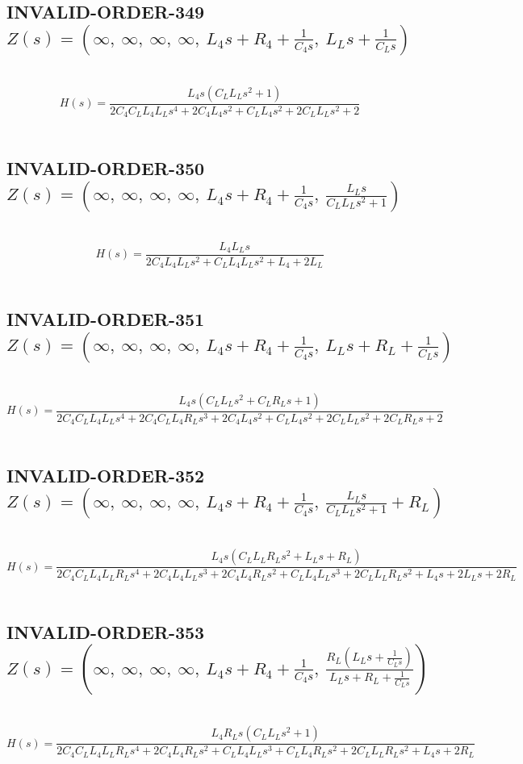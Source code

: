 \documentclass{article}
\begin{document}
\subsection{INVALID-ORDER-349 $Z(s) = \left( \infty, \  \infty, \  \infty, \  \infty, \  L_{4} s + R_{4} + \frac{1}{C_{4} s}, \  L_{L} s + \frac{1}{C_{L} s}\right)$ } \ 
\textbf{\[H(s) = \frac{L_{4} s \left(C_{L} L_{L} s^{2} + 1\right)}{2 C_{4} C_{L} L_{4} L_{L} s^{4} + 2 C_{4} L_{4} s^{2} + C_{L} L_{4} s^{2} + 2 C_{L} L_{L} s^{2} + 2}\] } \ 
\subsection{INVALID-ORDER-350 $Z(s) = \left( \infty, \  \infty, \  \infty, \  \infty, \  L_{4} s + R_{4} + \frac{1}{C_{4} s}, \  \frac{L_{L} s}{C_{L} L_{L} s^{2} + 1}\right)$ } \ 
\textbf{\[H(s) = \frac{L_{4} L_{L} s}{2 C_{4} L_{4} L_{L} s^{2} + C_{L} L_{4} L_{L} s^{2} + L_{4} + 2 L_{L}}\] } \ 
\subsection{INVALID-ORDER-351 $Z(s) = \left( \infty, \  \infty, \  \infty, \  \infty, \  L_{4} s + R_{4} + \frac{1}{C_{4} s}, \  L_{L} s + R_{L} + \frac{1}{C_{L} s}\right)$ } \ 
\textbf{\[H(s) = \frac{L_{4} s \left(C_{L} L_{L} s^{2} + C_{L} R_{L} s + 1\right)}{2 C_{4} C_{L} L_{4} L_{L} s^{4} + 2 C_{4} C_{L} L_{4} R_{L} s^{3} + 2 C_{4} L_{4} s^{2} + C_{L} L_{4} s^{2} + 2 C_{L} L_{L} s^{2} + 2 C_{L} R_{L} s + 2}\] } \ 
\subsection{INVALID-ORDER-352 $Z(s) = \left( \infty, \  \infty, \  \infty, \  \infty, \  L_{4} s + R_{4} + \frac{1}{C_{4} s}, \  \frac{L_{L} s}{C_{L} L_{L} s^{2} + 1} + R_{L}\right)$ } \ 
\textbf{\[H(s) = \frac{L_{4} s \left(C_{L} L_{L} R_{L} s^{2} + L_{L} s + R_{L}\right)}{2 C_{4} C_{L} L_{4} L_{L} R_{L} s^{4} + 2 C_{4} L_{4} L_{L} s^{3} + 2 C_{4} L_{4} R_{L} s^{2} + C_{L} L_{4} L_{L} s^{3} + 2 C_{L} L_{L} R_{L} s^{2} + L_{4} s + 2 L_{L} s + 2 R_{L}}\] } \ 
\subsection{INVALID-ORDER-353 $Z(s) = \left( \infty, \  \infty, \  \infty, \  \infty, \  L_{4} s + R_{4} + \frac{1}{C_{4} s}, \  \frac{R_{L} \left(L_{L} s + \frac{1}{C_{L} s}\right)}{L_{L} s + R_{L} + \frac{1}{C_{L} s}}\right)$ } \ 
\textbf{\[H(s) = \frac{L_{4} R_{L} s \left(C_{L} L_{L} s^{2} + 1\right)}{2 C_{4} C_{L} L_{4} L_{L} R_{L} s^{4} + 2 C_{4} L_{4} R_{L} s^{2} + C_{L} L_{4} L_{L} s^{3} + C_{L} L_{4} R_{L} s^{2} + 2 C_{L} L_{L} R_{L} s^{2} + L_{4} s + 2 R_{L}}\] } \ 
\end{document}
